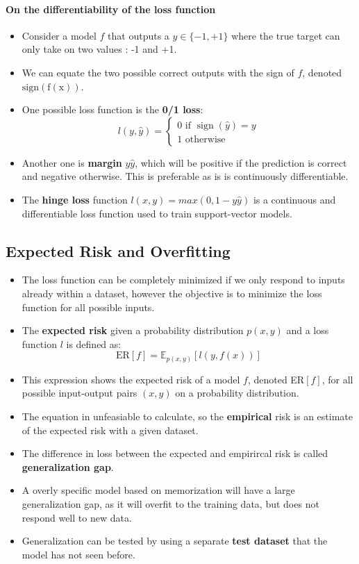\documentclass{article}
\newcommand{\tbf}[1]{\textbf{#1}}
\begin{document}
\paragraph{On the differentiability of the loss function}
\begin{itemize}
    \item Consider a model $f$ that outputs a $y \in \{-1,+1\}$ where the true target can only take on two values : -1 and +1.
    \item We can equate the two possible correct outputs with the sign of $f$, denoted $\operatorname{sign(f(x))}$.
    \item One possible loss function is the \tbf{0/1 loss}:
    \[
    l(y, \hat{y}) = 
    \begin{cases}
        0 \text{ if } \operatorname{sign}(\hat{y}) = y \\
        1 \text{ otherwise }
    \end{cases}
    \]
    \item Another one is \tbf{margin} $y \hat{y}$, which will be positive if the prediction is correct and negative otherwise. 
    This is preferable as is is continuously differentiable. 
    \item The \tbf{hinge loss} function $l(x,y) = max(0,1-y\hat{y})$ is a continuous and differentiable loss function used to train support-vector models.
\end{itemize}

\subsection{Expected Risk and Overfitting}

\begin{itemize}
    \item The loss function can be completely minimized if we only respond to inputs already within a dataset, 
    however the objective is to minimize the loss function for all possible inputs.
    \item The \tbf{expected risk} given a probability distribution $p(x,y)$ and a loss function $l$ is defined as:
    \[\text{ER}[f] = \mathbb{E}_{p(x,y)}[l(y,f(x))]\]
    \item This expression shows the expected risk of a model $f$, denoted ER$[f]$, for all possible input-output pairs $(x,y)$ on a probability distribution. 
    \item The equation in unfeasiable to calculate, so the \tbf{empirical} risk is an estimate of the expected risk with a given dataset.
    \item The difference in loss between the expected and empirircal risk is called \tbf{generalization gap}. 
    \item A overly specific model based on memorization will have a large generalization gap, as it will overfit to the training data, 
    but does not respond well to new data.
    \item Generalization can be tested by using a separate \tbf{test dataset} that the model has not seen before.
\end{itemize}
\end{document}

